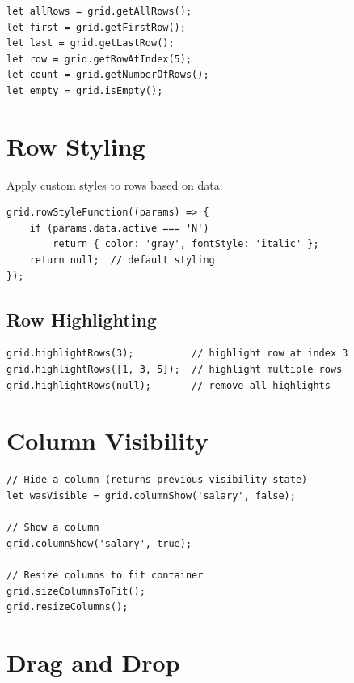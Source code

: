 \begin{lstlisting}[style=javascript]
let allRows = grid.getAllRows();
let first = grid.getFirstRow();
let last = grid.getLastRow();
let row = grid.getRowAtIndex(5);
let count = grid.getNumberOfRows();
let empty = grid.isEmpty();
\end{lstlisting}

\section{Row Styling}
\label{sec:grid-styling}

Apply custom styles to rows based on data:

\begin{lstlisting}[style=javascript]
grid.rowStyleFunction((params) => {
    if (params.data.active === 'N')
        return { color: 'gray', fontStyle: 'italic' };
    return null;  // default styling
});
\end{lstlisting}

\subsection{Row Highlighting}

\begin{lstlisting}[style=javascript]
grid.highlightRows(3);          // highlight row at index 3
grid.highlightRows([1, 3, 5]);  // highlight multiple rows
grid.highlightRows(null);       // remove all highlights
\end{lstlisting}

\section{Column Visibility}
\label{sec:grid-colvis}

\begin{lstlisting}[style=javascript]
// Hide a column (returns previous visibility state)
let wasVisible = grid.columnShow('salary', false);

// Show a column
grid.columnShow('salary', true);

// Resize columns to fit container
grid.sizeColumnsToFit();
grid.resizeColumns();
\end{lstlisting}

\section{Drag and Drop}
\label{sec:grid-drag}

